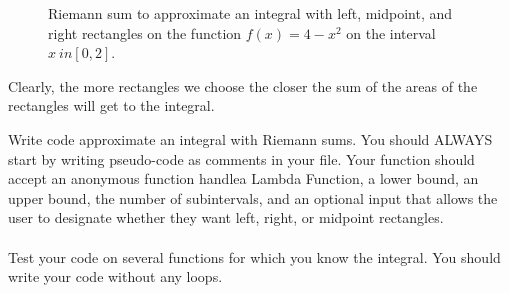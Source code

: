 \begin{figure}[ht!]
    \begin{center}
    \end{center}
    \caption{Riemann sum to approximate an integral with left, midpoint, and right
    rectangles on the function $f(x) = 4 - x^2$ on the interval $x \ in [0,2]$.}
    \label{fig:integral_with_rectangles}
\end{figure}

Clearly, the more rectangles we choose the closer the sum of the areas of the rectangles will get to the integral.
\begin{problem}
    Write \ProgLang code approximate an integral with Riemann sums. You should ALWAYS start by writing pseudo-code as comments in your
    \ProgLang file.    Your \ProgLang function
    should accept \ifnum{} an anonymous function handle\else a Lambda Function\fi, a lower bound, an upper bound, the number
    of subintervals, and an optional input that allows the user to designate whether they
    want left, right, or midpoint rectangles. \\
    \ifnum{}
    \else
    \fi
    \\
    Test your code on several functions for which you know the integral.  You should write
    your code without any  loops.
\end{problem}

